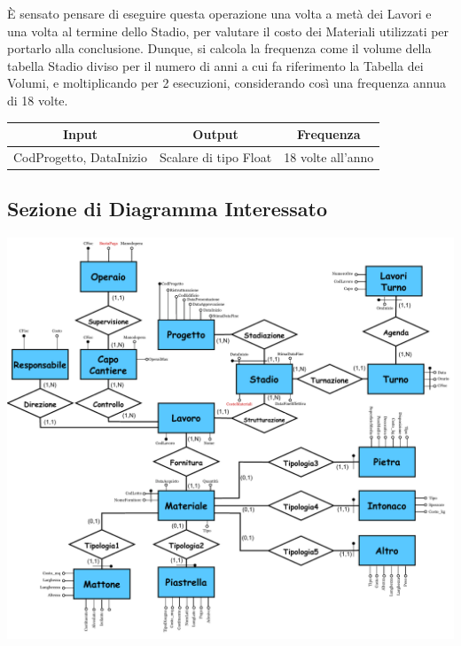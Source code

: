 \documentclass[12pt,a4paper]{report}
\begin{document}
        È sensato pensare di eseguire questa operazione una volta a metà dei Lavori e una volta al termine dello Stadio, per valutare il costo dei Materiali utilizzati per portarlo alla conclusione. Dunque, si calcola la frequenza come il volume della tabella Stadio diviso per il numero di anni a cui fa riferimento la Tabella dei Volumi, e moltiplicando per 2 esecuzioni, considerando così una frequenza annua di 18 volte. 
            \begin{center}
                \begin{tabular}{|c|c|c|}
                    \hline
                    \rowcolor{viola} \textbf{Input} & \textbf{Output} & \textbf{Frequenza} \\ \hline
                    CodProgetto, DataInizio & Scalare di tipo Float & 18 volte all'anno \\ \hline
                \end{tabular}
            \end{center}
            
            \subsection{Sezione di Diagramma Interessato}
            \begin{center}
                \includegraphics[scale=0.8]{sezione_operazione5.pdf}
            \end{center}
            
\end{document}
